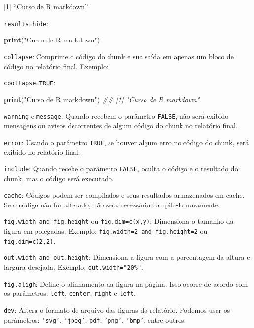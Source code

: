 \documentclass[
]{book}
\newenvironment{Shaded}{\begin{snugshade}}{\end{snugshade}}
\newcommand{\CommentTok}[1]{\textcolor[rgb]{0.56,0.35,0.01}{\textit{#1}}}
\newcommand{\KeywordTok}[1]{\textcolor[rgb]{0.13,0.29,0.53}{\textbf{#1}}}
\newcommand{\NormalTok}[1]{#1}
\newcommand{\StringTok}[1]{\textcolor[rgb]{0.31,0.60,0.02}{#1}}
\begin{document}
{[}1{]} ``Curso de R markdown''

\texttt{results=\textquotesingle{}hide\textquotesingle{}}:

\begin{Shaded}
\begin{Highlighting}[]
\KeywordTok{print}\NormalTok{(}\StringTok{"Curso de R markdown"}\NormalTok{)}
\end{Highlighting}
\end{Shaded}

\texttt{collapse}: Comprime o código do chunk e sua saída em apenas um bloco de código no relatório final. Exemplo:

\texttt{coollapse=TRUE}:

\begin{Shaded}
\begin{Highlighting}[]
\KeywordTok{print}\NormalTok{(}\StringTok{"Curso de R markdown"}\NormalTok{)}
\CommentTok{\#\# [1] "Curso de R markdown"}
\end{Highlighting}
\end{Shaded}

\texttt{warning} e \texttt{message}: Quando recebem o parâmetro \texttt{FALSE}, não será exibido mensagens ou avisos decorrentes de algum código do chunk no relatório final.

\texttt{error}: Usando o parâmetro \texttt{TRUE}, se houver algum erro no código do chunk, será exibido no relatório final.

\texttt{include}: Quando recebe o parâmetro \texttt{FALSE}, oculta o código e o resultado do chunk, mas o código será executado.

\texttt{cache}: Códigos podem ser compilados e seus resultados armazenados em cache. Se o código não for alterado, não sera necessário compila-lo novamente.

\texttt{fig.width\ and\ fig.height} ou \texttt{fig.dim=c(x,y)}: Dimensiona o tamanho da figura em polegadas. Exemplo: \texttt{fig.width=2\ and\ fig.height=2} ou \texttt{fig.dim=c(2,2)}.

\texttt{out.width\ and\ out.height}: Dimensiona a figura com a porcentagem da altura e largura desejada. Exemplo: \texttt{out.width="20\%"}.

\texttt{fig.aligh}: Define o alinhamento da figura na página. Isso ocorre de acordo com os parâmetros: \texttt{left}, \texttt{center}, \texttt{right} e \texttt{left}.

\texttt{dev}: Altera o formato de arquivo das figuras do relatório. Podemos usar os parâmetros: \texttt{’svg’}, \texttt{’jpeg’}, \texttt{\textquotesingle{}pdf\textquotesingle{}}, \texttt{’png’}, \texttt{’bmp’}, entre outros.
\end{document}
